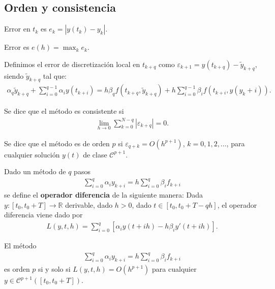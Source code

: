 \subsection{Orden y consistencia}

\begin{defi}
    Error en $t_k$ es $e_k = |y(t_k) - y_k|$.
\end{defi}
\begin{defi}
    Error es $e(h) = \max_{k} e_k$.
\end{defi}

\begin{defi}
    Definimos el error de discretización local en $t_{k+q}$ como $\varepsilon_{k+1} = y(t_{k+q}) - \widetilde{y}_{k+q}$, siendo $\widetilde{y}_{k+q}$ tal que:
    \begin{align*}
        \alpha_q \widetilde{y}_{k+q} + \sum_{i=0}^{q-1} \alpha_i y(t_{k+i}) = h\beta_q f(t_{k+q},\widetilde{y}_{k+q}) + h\sum_{i=0}^{q-1} \beta_i f(t_{k+i},y(y_k+i)).
    \end{align*}
\end{defi}

\begin{defi}
    Se dice que el método es consistente si
    \begin{align*}
        \lim_{h \to 0} \sum_{k=0}^{N - q} |\varepsilon_{k+q}| = 0.
    \end{align*}
\end{defi}

\begin{defi}
    Se dice que el método es de orden $p$ si $\varepsilon_{q+k} = O(h^{p+1})$, $k=0,1,2,\ldots$, para cualquier solución $y(t)$ de clase $\mathcal{C}^{p+1}$.
\end{defi}

\begin{defi}
    Dado un método de $q$ pasos
    \begin{align*}
        \sum_{i=0}^{q} \alpha_i y_{k+i} = h\sum_{i=0}^{q} \beta_i f_{k+i}
    \end{align*}
    se define el \textbf{operador diferencia} de la siguiente manera: Dada $y:[t_0,t_0+T] \longrightarrow \mathbb{R}$ derivable, dado $h>0$, dado $t \in [t_0,t_0+T-qh]$, el operador diferencia viene dado por
    \begin{align*}
        L(y,t,h) = \sum_{i=0}^{q}[\alpha_i y(t+ih) - h\beta_i y'(t+ih)].
    \end{align*}
\end{defi}

\begin{teo}
    El método
    \begin{align*}
        \sum_{i=0}^{q} \alpha_i y_{k+i} = h\sum_{i=0}^{q} \beta_i f_{k+i}
    \end{align*}
    es orden $p$ si y solo si $L(y,t,h) = O(h^{p+1})$ para cualquier $y \in \mathcal{C}^{p+1}([t_0,t_0+T])$.
\end{teo}


